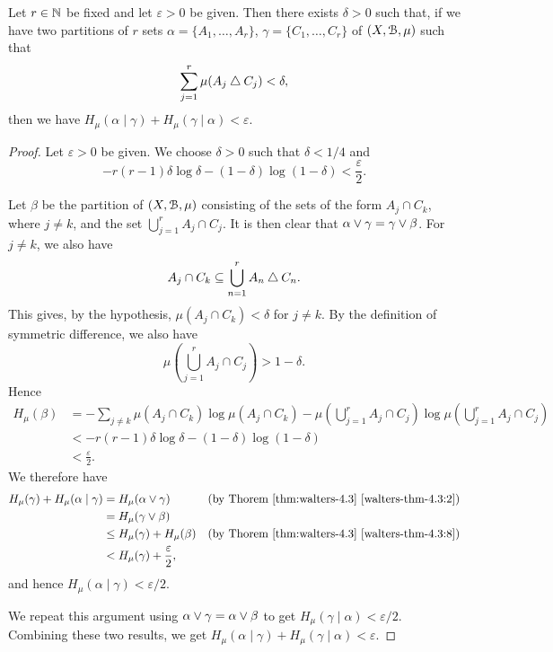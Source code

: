 \begin{lemma} \label{lem:walters-4-15}
	Let $r \in \mathbb{N}$ be fixed and let $\varepsilon > 0$ be given. Then there exists $\delta > 0$ such that, if we have two partitions of $r$ sets $\alpha = \{A_1, \dots, A_r\}$, $\gamma = \{C_1, \dots, C_r\}$ of $(X, \mathcal{B}, \mu)$ such that
	\[
		\sum_{j = 1}^r{\mu(A_j \bigtriangleup C_j)} < \delta,
	\]
	then we have $H_\mu(\alpha \mid \gamma) + H_\mu(\gamma \mid \alpha) < \varepsilon$.
	\begin{proof}
		Let $\varepsilon > 0$ be given. We choose $\delta > 0$ such that $\delta < 1 / 4$ and
		\[
			-r(r - 1) \delta \log{\delta} - (1 - \delta) \log(1 - \delta) < \frac{\varepsilon}{2}.
		\]
		
		Let $\beta$ be the partition of $(X, \mathcal{B}, \mu)$ consisting of the sets of the form $A_j \cap C_k$, where $j \neq k$, and the set $\bigcup_{j = 1}^r{A_j \cap C_j}$. It is then clear that $\alpha \vee \gamma = \gamma \vee \beta$. For $j \neq k$, we also have
		\[
			A_j \cap C_k \subseteq \bigcup_{n = 1}^r{A_n \bigtriangleup C_n}.
		\]
		This gives, by the hypothesis, $\mu(A_j \cap C_k) < \delta$ for $j \neq k$. By the definition of symmetric difference, we also have
		\[
			\mu\left(\bigcup_{j = 1}^r{A_j \cap C_j}\right) > 1 - \delta.
		\]
		Hence
		\begin{align*}
			H_\mu(\beta) &= -\sum_{j \neq k}{\mu(A_j \cap C_k) \log{\mu(A_j \cap C_k)}} - \mu\left(\bigcup_{j = 1}^r{A_j \cap C_j}\right) \log{\mu\left(\bigcup_{j = 1}^r{A_j \cap C_j}\right)} \\
				&< -r(r - 1) \delta \log{\delta} - (1 - \delta) \log(1 - \delta) \\
				&< \frac{\varepsilon}{2}.
		\end{align*}
		We therefore have
		\begin{align*}
			H_\mu(\gamma) + H_\mu(\alpha \mid \gamma) &= H_\mu(\alpha \vee \gamma) & \text{(by Thorem \ref{thm:walters-4.3} \ref{walters-thm-4.3:2})} \\
				&= H_\mu(\gamma \vee \beta) \\
				&\leq H_\mu(\gamma) + H_\mu(\beta) & \text{(by Thorem \ref{thm:walters-4.3} \ref{walters-thm-4.3:8})} \\
				&< H_\mu(\gamma) + \frac{\varepsilon}{2},
		\end{align*}
		and hence $H_\mu(\alpha \mid \gamma) < \varepsilon / 2$.
		
		We repeat this argument using $\alpha \vee \gamma = \alpha \vee \beta$ to get $H_\mu(\gamma \mid \alpha) < \varepsilon / 2$. Combining these two results, we get $H_\mu(\alpha \mid \gamma) + H_\mu(\gamma \mid \alpha) < \varepsilon$.
	\end{proof}
\end{lemma}

